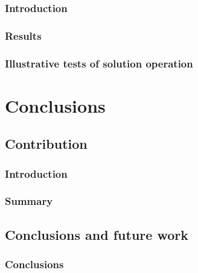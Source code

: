 \documentclass[
  oneside,
  11pt, a4paper,
  footinclude=true,
  headinclude=true,
  cleardoublepage=empty
]{scrbook}
\begin{document}
\section{Introduction}
\section{Results}


\section{Illustrative tests of solution operation}


\part{Conclusions}

\chapter{Contribution}
\section{Introduction}
\section{Summary}


\chapter{Conclusions and future work}
\section{Conclusions}
\end{document}
